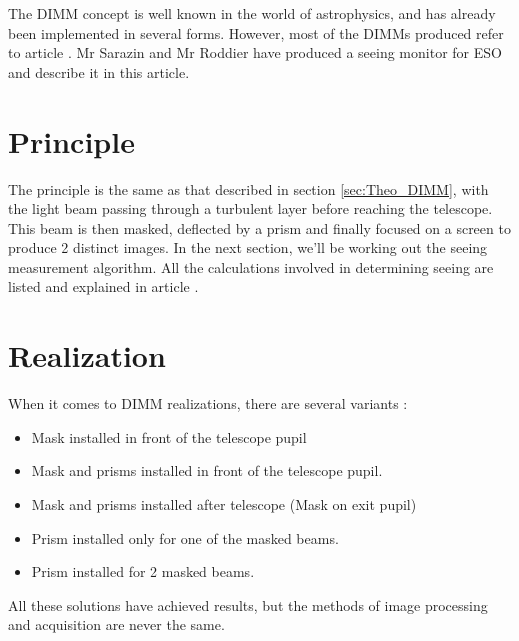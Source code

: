 The DIMM concept is well known in the world of astrophysics, and has already been implemented in several forms.
However, most of the DIMMs produced refer to article \cite{DIMM_ESO}. Mr Sarazin and Mr Roddier have produced 
a seeing monitor for ESO and describe it in this article.

\section{Principle}
The principle is the same as that described in section \ref{sec:Theo_DIMM}, with the light beam passing through a turbulent layer 
before reaching the telescope. This beam is then masked, deflected by a prism and finally focused on a screen to produce 
2 distinct images. In the next section, we'll be working out the seeing measurement algorithm. All the calculations involved 
in determining seeing are listed and explained in article \cite{DIMM_ESO}.
\section{Realization}
When it comes to DIMM realizations, there are several variants :
\begin{itemize}
    \item Mask installed in front of the telescope pupil
    \item Mask and prisms installed in front of the telescope pupil.
    \item Mask and prisms installed after telescope (Mask on exit pupil)
    \item Prism installed only for one of the masked beams.
    \item Prism installed for 2 masked beams.
\end{itemize}
All these solutions have achieved results, but the methods of image processing and acquisition are never the same.

